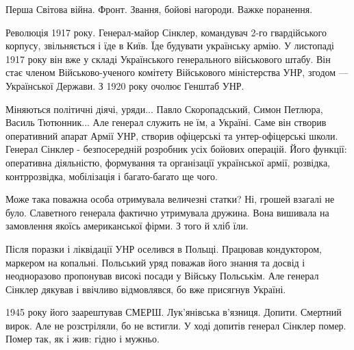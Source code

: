 Перша Світова війна. Фронт. Звання, бойові нагороди. Важке поранення. 

Революція 1917 року. Генерал-майор Сінклер, командувач 2-го гвардійського
корпусу, звільняється і їде в Київ. Їде будувати українську армію. У листопаді
1917 року він вже у складі Українського генерального військового штабу. Він
стає членом Військово-ученого комітету Військового міністерства УНР, згодом —
Української Держави. З 1920 року очолює Генштаб УНР. 

Міняються політичні діячі, уряди... Павло Скоропадський, Симон Петлюра, Василь
Тютюнник... Але генерал служить не їм, а Україні. Саме він створив оперативний
апарат Армії УНР, створив офіцерські та унтер-офіцерські школи. Генерал Сінклер
- безпосередній розробник усіх бойових операцій. Його функції: оперативна
діяльністю, формування та організації української армії, розвідка,
контррозвідка, мобілізація і багато-багато ще чого. 

Може така поважна особа отримувала величезні статки? Ні, грошей взагалі не
було. Славетного генерала фактично утримувала дружина. Вона вишивала на
замовлення якоїсь американської фірми. З того й хліб їли. 

Після поразки і ліквідації УНР оселився в Польщі. Працював кондуктором,
маркером на копальні. Польський уряд поважав його знання та досвід і
неодноразово пропонував високі посади у Війську Польськім. Але генерал Сінклер
дякував і ввічливо відмовлявся, бо вже присягнув Україні. 

1945 року його заарештував СМЕРШ. Лук’янівська в’язниця. Допити. Смертний
вирок. Але не розстріляли, бо не встигли. У ході допитів генерал Сінклер помер.
Помер так, як і жив: гідно і мужньо.

